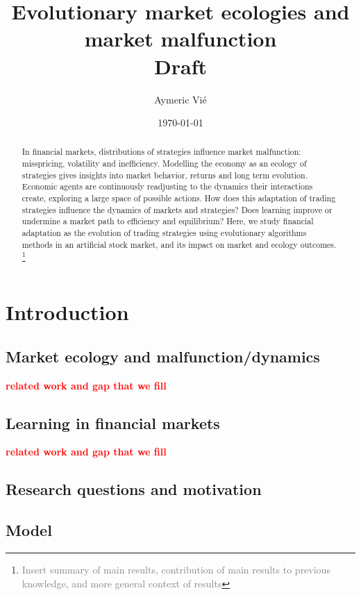 \documentclass{article}
\title{Evolutionary market ecologies and market malfunction\\
Draft}
\author{Aymeric Vi\'{e}}
\date{\today}
\newcommand\boldred[1]{\textcolor{red}{\textbf{#1}}}
\begin{document}
\maketitle

\tableofcontents

\clearpage

\begin{abstract}
    In financial markets, distributions of strategies influence market malfunction: misspricing, volatility and inefficiency. Modelling the economy as an ecology of strategies gives insights into market behavior, returns and long term evolution.
    Economic agents are continuously readjusting to the dynamics their interactions create, exploring a large space of possible actions.
    How does this adaptation of trading strategies influence the dynamics of markets and strategies? Does learning improve or undermine a market path to efficiency and equilibrium?
    Here, we study financial adaptation as the evolution of trading strategies using evolutionary algorithms methods in an artificial stock market, and its impact on market and ecology outcomes. 
    \footnote{\textcolor{gray}{Insert summary of main results, contribution of main results to previous knowledge, and more general context of results}}
\end{abstract}

\section{Introduction}

\subsection{Market ecology and malfunction/dynamics}
\boldred{related work and gap that we fill}
\subsection{Learning in financial markets}
\boldred{related work and gap that we fill}
\subsection{Research questions and motivation}
\subsection{Model}
\end{document}
